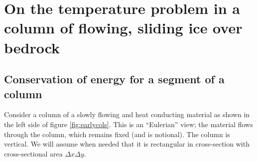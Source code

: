 \documentclass[12pt,final]{amsart}%
\theoremstyle{plain}
\theoremstyle{definition}
\theoremstyle{remark}
\newcommand{\ufrac}[2]{\ensuremath{\frac{\text{#1}}{\text{#2}} }}
\begin{document}
\begin{comment}
\section{Index of notation}  %

\section{Constants}

These values are from \citep{EISMINT96}: \scriptsize
\begin{align*}
\rho &= 910\, \frac{\text{kg}}{\text{m}^3} \quad(\text{density of ice}) & R &= 8.321\,  \ufrac{J}{mol K} \quad (\text{gas constant})\\
g &= 9.81\, \frac{\text{m}}{\text{s}^2} \quad (\text{acceleration of gravity})& \kappa &= 1.17\\
k &= 2.10\, \frac{\text{J}}{\text{m K s}} \quad (\text{thermal conductivity of ice}) & c &= 0.16612 \, \text{K}^{\kappa} \\
C_p &= 2009\, \ufrac{J}{kg K} \quad (\text{specific heat capacity of ice})& T_r&=273.39\, \text{K} \\
A_0 &= 2.948\times 10^{-9} \frac{1}{\text{Pa}^3 \text{s}} &  G &= .042 \frac{\text{J}}{\text{m}^2\text{s}} \quad (\text{geothermal heat flux}) \\
Q &= 7.88\times 10^4 \ufrac{J}{mol} \quad (\text{activation energy for creep})&  \beta &=8.7\times 10^{-4} \ufrac{K}{m} \quad (\text{change of melting point with depth})
\end{align*}
\normalsize
\end{comment}




\newpage
\section{On the temperature problem in a column of flowing, sliding ice over bedrock}

\subsection*{Conservation of energy for a segment of a column}  Consider a column of a slowly flowing and heat conducting material as shown in the left side of figure \ref{fig:earlycols}.  This is an ``Eulerian'' view; the material flows through the column, which remains fixed (and is notional).  The column is vertical.  We will assume when needed that it is rectangular in cross-section with cross-sectional area $\Delta x\Delta y$.
\end{document}
